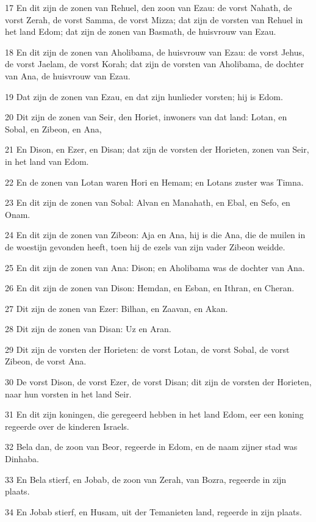 \par 17 En dit zijn de zonen van Rehuel, den zoon van Ezau: de vorst Nahath, de vorst Zerah, de vorst Samma, de vorst Mizza; dat zijn de vorsten van Rehuel in het land Edom; dat zijn de zonen van Basmath, de huisvrouw van Ezau.
\par 18 En dit zijn de zonen van Aholibama, de huisvrouw van Ezau: de vorst Jehus, de vorst Jaelam, de vorst Korah; dat zijn de vorsten van Aholibama, de dochter van Ana, de huisvrouw van Ezau.
\par 19 Dat zijn de zonen van Ezau, en dat zijn hunlieder vorsten; hij is Edom.
\par 20 Dit zijn de zonen van Seir, den Horiet, inwoners van dat land: Lotan, en Sobal, en Zibeon, en Ana,
\par 21 En Dison, en Ezer, en Disan; dat zijn de vorsten der Horieten, zonen van Seir, in het land van Edom.
\par 22 En de zonen van Lotan waren Hori en Hemam; en Lotans zuster was Timna.
\par 23 En dit zijn de zonen van Sobal: Alvan en Manahath, en Ebal, en Sefo, en Onam.
\par 24 En dit zijn de zonen van Zibeon: Aja en Ana, hij is die Ana, die de muilen in de woestijn gevonden heeft, toen hij de ezels van zijn vader Zibeon weidde.
\par 25 En dit zijn de zonen van Ana: Dison; en Aholibama was de dochter van Ana.
\par 26 En dit zijn de zonen van Dison: Hemdan, en Esban, en Ithran, en Cheran.
\par 27 Dit zijn de zonen van Ezer: Bilhan, en Zaavan, en Akan.
\par 28 Dit zijn de zonen van Disan: Uz en Aran.
\par 29 Dit zijn de vorsten der Horieten: de vorst Lotan, de vorst Sobal, de vorst Zibeon, de vorst Ana.
\par 30 De vorst Dison, de vorst Ezer, de vorst Disan; dit zijn de vorsten der Horieten, naar hun vorsten in het land Seir.
\par 31 En dit zijn koningen, die geregeerd hebben in het land Edom, eer een koning regeerde over de kinderen Israels.
\par 32 Bela dan, de zoon van Beor, regeerde in Edom, en de naam zijner stad was Dinhaba.
\par 33 En Bela stierf, en Jobab, de zoon van Zerah, van Bozra, regeerde in zijn plaats.
\par 34 En Jobab stierf, en Husam, uit der Temanieten land, regeerde in zijn plaats.
